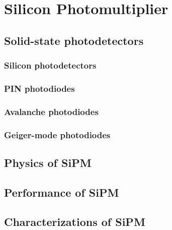 \chapter{Silicon Photomultiplier}

\section{Solid-state photodetectors}
\subsection{Silicon photodetectors}
\subsection{PIN photodiodes}
\subsection{Avalanche photodiodes}
\subsection{Geiger-mode photodiodes}

\section{Physics of SiPM}

\section{Performance of SiPM}

\section{Characterizations of SiPM}


















